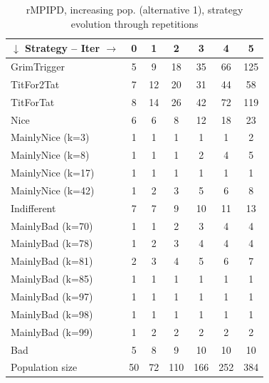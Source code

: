 \documentclass[journal,10pt,twoside]{IEEEtran}
\begin{document}
\begin{table}[ht]
	\caption{rMPIPD, increasing pop. (alternative 1), strategy evolution through repetitions}
	\label{tab:ripdmp-incr}
	\centering
	\begin{tabular}{l|cccccc} \toprule
		$\downarrow$ Strategy -- Iter $\rightarrow$ & 0 & 1 & 2 & 3 & 4 & 5 \\ \midrule
		GrimTrigger       &  5 &   9 &  18 &  35 &  66 &  125 \\
		TitFor2Tat        &  7 &  12 &  20 &  31 &  44 &   58 \\
		TitForTat         &  8 &  14 &  26 &  42 &  72 &  119 \\
		Nice              &  6 &   6 &   8 &  12 &  18 &   23 \\
		MainlyNice (k=3)  &  1 &   1 &   1 &   1 &   1 &    2 \\
		MainlyNice (k=8)  &  1 &   1 &   1 &   2 &   4 &    5 \\
		MainlyNice (k=17) &  1 &   1 &   1 &   1 &   1 &    1 \\
		MainlyNice (k=42) &  1 &   2 &   3 &   5 &   6 &    8 \\
		Indifferent       &  7 &   7 &   9 &  10 &  11 &   13 \\
		MainlyBad (k=70)  &  1 &   1 &   2 &   3 &   4 &    4 \\
		MainlyBad (k=78)  &  1 &   2 &   3 &   4 &   4 &    4 \\
		MainlyBad (k=81)  &  2 &   3 &   4 &   5 &   6 &    7 \\
		MainlyBad (k=85)  &  1 &   1 &   1 &   1 &   1 &    1 \\
		MainlyBad (k=97)  &  1 &   1 &   1 &   1 &   1 &    1 \\
		MainlyBad (k=98)  &  1 &   1 &   1 &   1 &   1 &    1 \\
		MainlyBad (k=99)  &  1 &   2 &   2 &   2 &   2 &    2 \\
		Bad               &  5 &   8 &   9 &  10 &  10 &   10 \\ \midrule
		Population size   & 50 &  72 & 110 & 166 & 252 &  384 \\ \bottomrule
	\end{tabular}
\end{table}
\end{document}
